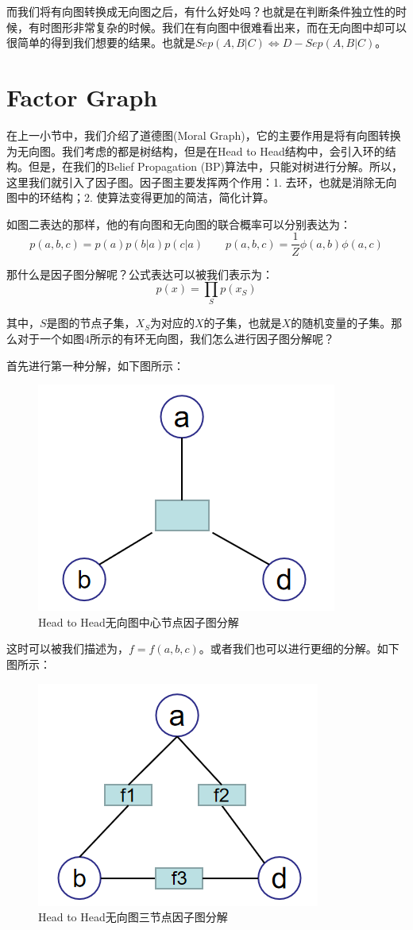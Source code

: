 \documentclass[a4paper]{article}
\begin{document}
而我们将有向图转换成无向图之后，有什么好处吗？也就是在判断条件独立性的时候，有时图形非常复杂的时候。我们在有向图中很难看出来，而在无向图中却可以很简单的得到我们想要的结果。也就是$Sep(A,B|C) \Longleftrightarrow D-Sep(A,B|C)$。

\section{Factor Graph}
在上一小节中，我们介绍了道德图(Moral Graph)，它的主要作用是将有向图转换为无向图。我们考虑的都是树结构，但是在Head to Head结构中，会引入环的结构。但是，在我们的Belief Propagation (BP)算法中，只能对树进行分解。所以，这里我们就引入了因子图。因子图主要发挥两个作用：1. 去环，也就是消除无向图中的环结构；2. 使算法变得更加的简洁，简化计算。

如图二表达的那样，他的有向图和无向图的联合概率可以分别表达为：
\begin{equation}
    p(a,b,c) = p(a)p(b|a)p(c|a) \qquad p(a,b,c) = \frac{1}{Z}\phi(a,b)\phi(a,c)
\end{equation}

那什么是因子图分解呢？公式表达可以被我们表示为：
\begin{equation}
    p(x) = \prod_{S}p(x_S)
\end{equation}

其中，$S$是图的节点子集，$X_S$为对应的$X$的子集，也就是$X$的随机变量的子集。那么对于一个如图4所示的有环无向图，我们怎么进行因子图分解呢？

首先进行第一种分解，如下图所示：
\begin{figure}[H]
    \centering
    \includegraphics[width=.35\textwidth]{微信图片_20191212093305.png}
    \caption{Head to Head无向图中心节点因子图分解}
    \label{fig:my_label_1}
\end{figure}

这时可以被我们描述为，$f = f(a,b,c)$。或者我们也可以进行更细的分解。如下图所示：
\begin{figure}[H]
    \centering
    \includegraphics[width=.35\textwidth]{微信图片_20191212094218.png}
    \caption{Head to Head无向图三节点因子图分解}
    \label{fig:my_label_1}
\end{figure}
\end{document}
